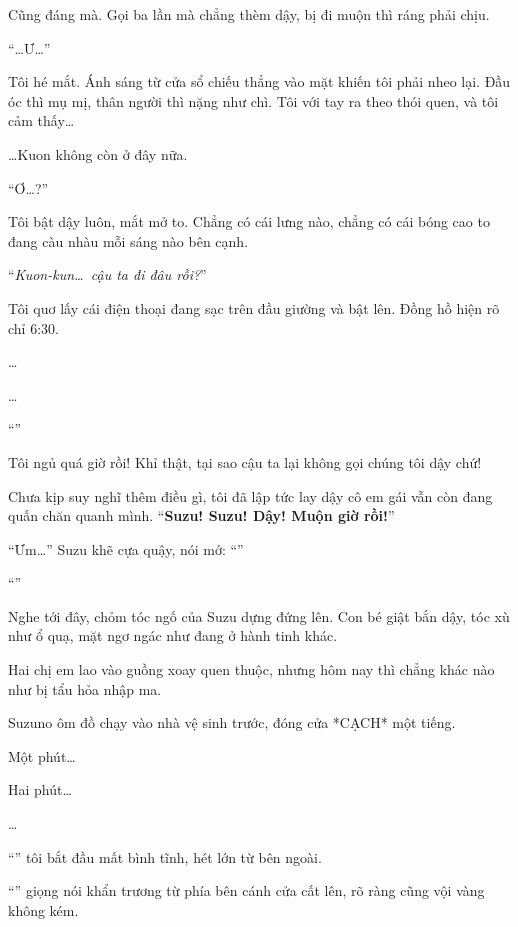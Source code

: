 \documentclass[../main.tex]{subfiles}
\begin{document}
Cũng đáng mà. Gọi ba lần mà chẳng thèm dậy, bị đi muộn thì ráng phải chịu.


``\dots Ư\dots''

Tôi hé mắt. Ánh sáng từ cửa sổ chiếu thẳng vào mặt khiến tôi phải nheo lại. Đầu óc thì mụ mị, thân người thì nặng như chì. Tôi với tay ra theo thói quen, và tôi cảm thấy\dots

\dots Kuon không còn ở đây nữa.

``Ơ\dots?''

Tôi bật dậy luôn, mắt mở to. Chẳng có cái lưng nào, chẳng có cái bóng cao to đang càu nhàu mỗi sáng nào bên cạnh.

``\textit{Kuon-kun\dots\ cậu ta đi đâu rồi?}''

Tôi quơ lấy cái điện thoại đang sạc trên đầu giường và bật lên. Đồng hồ hiện rõ chỉ 6:30.

\dots

\dots

``\textbf{}''

Tôi ngủ quá giờ rồi! Khỉ thật, tại sao cậu ta lại không gọi chúng tôi dậy chứ!

Chưa kịp suy nghĩ thêm điều gì, tôi đã lập tức lay dậy cô em gái vẫn còn đang quấn chăn quanh mình. ``\textbf{Suzu! Suzu! Dậy! Muộn giờ rồi!}''

``Ưm\dots'' Suzu khẽ cựa quậy, nói mớ: ``''

``\textbf{}''

Nghe tới đây, chỏm tóc ngố của Suzu dựng đứng lên. Con bé giật bắn dậy, tóc xù như ổ quạ, mặt ngơ ngác như đang ở hành tinh khác.

Hai chị em lao vào guồng xoay quen thuộc, nhưng hôm nay thì chẳng khác nào như bị tẩu hỏa nhập ma.

Suzuno ôm đồ chạy vào nhà vệ sinh trước, đóng cửa *CẠCH* một tiếng.

Một phút\dots

Hai phút\dots

\dots

``\textbf{}'' tôi bắt đầu mất bình tĩnh, hét lớn từ bên ngoài.

``'' giọng nói khẩn trương từ phía bên cánh cửa cất lên, rõ ràng cũng vội vàng không kém.
\end{document}
